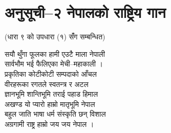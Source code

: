 \section{अनुसूची–२ नेपालको राष्ट्रिय गान}

(धारा ९ को उपधारा (१) सँंग सम्बन्धित)

सयौ थुँगा फूलका हामी एउटै माला नेपाली\\
सार्वभौम भई फैलिएका मेची–महाकाली ।\\
प्रकृतिका कोटीकोटी सम्पदाको आँचल\\
वीरहरूका रगतले स्वतन्त्र र अटल\\
ज्ञानभूमि शान्तिभूमि तराई पहाड हिमाल\\
अखण्ड यो प्यारो हाम्रो मातृभूमि नेपाल\\
बहुल जाति भाषा धर्म संस्कृति छन् विशाल\\
अग्रगामी राष्ट्र हाम्रो जय जय नेपाल ।\\